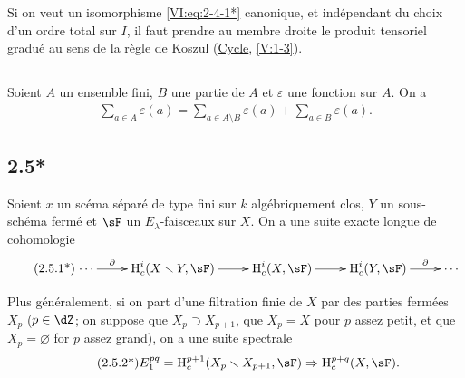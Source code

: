 Si on veut un isomorphisme \eqref{VI:eq:2-4-1*} canonique, et ind\'ependant du 
choix d'un ordre total sur $I$, il faut prendre au membre droite le produit 
tensoriel gradu\'e au sens de la r\`egle de Koszul 
(\hyperref[IV]{Cycle}, \ref{V:1-3}). 





\subsection{}\label{VI:2-5}

Soient $A$ un ensemble fini, $B$ une partie de $A$ et $\varepsilon$ une 
fonction sur $A$. On a 
\begin{align*}\tag{2.5.1}\label{VI:2-5-1}
  \sum_{a\in A} \varepsilon(a) = \sum_{a\in A\setminus B}\varepsilon(a) + \sum_{a\in B} \varepsilon(a) \text{.}
\end{align*}





\subsection*{2.5*}\label{VI:2-5*}

Soient $x$ un sc\'ema s\'epar\'e de type fini sur $k$ alg\'ebriquement clos, 
$Y$ un sous-sch\'ema ferm\'e et $\sF$ un $E_\lambda$-faisceaux sur $X$. On a 
une suite exacte longue de cohomologie 
\begin{align*}\tag{2.5.1*}\label{VI:eq:2-5-1*}
\xymatrix{
  \cdots \ar[r]^-\partial 
    & \h_c^i(X\setminus Y,\sF) \ar[r] 
    & \h_c^i(X,\sF) \ar[r] 
    & \h_c^i(Y,\sF) \ar[r]^-\partial 
    & \cdots 
}
\end{align*}

Plus g\'en\'eralement, si on part d'une filtration finie de $X$ par des parties 
ferm\'ees $X_p$ ($p\in \dZ$; on suppose que $X_p\supset X_{p+1}$, que $X_p=X$ 
pour $p$ assez petit, et que $X_p=\varnothing$ for $p$ assez grand), on a une 
suite spectrale 
\begin{align*}\tag{2.5.2*}\label{VI:eq:2-5-2*}
  E_1^{p q} = \h_c^{p+1}(X_p\setminus X_{p+1},\sF) \Rightarrow \h_c^{p+q}(X,\sF) \text{.}
\end{align*}





\subsection{}\label{VI:2-6}

